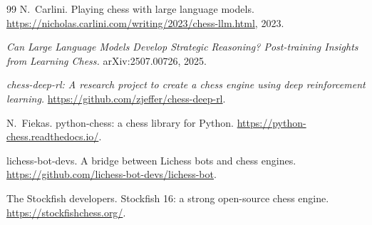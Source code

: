 \documentclass[11pt,a4paper]{article}
\begin{document}
\begin{thebibliography}{99}
N.\ Carlini.
\newblock Playing chess with large language models.
\newblock \url{https://nicholas.carlini.com/writing/2023/chess-llm.html}, 2023.

\emph{Can Large Language Models Develop Strategic Reasoning?
Post-training Insights from Learning Chess.}
\newblock arXiv:2507.00726, 2025.

\emph{chess-deep-rl: A research project to create a chess engine
using deep reinforcement learning.}
\newblock \url{https://github.com/zjeffer/chess-deep-rl}.

N.\ Fiekas.
\newblock python-chess: a chess library for Python.
\newblock \url{https://python-chess.readthedocs.io/}.

lichess-bot-devs.
\newblock A bridge between Lichess bots and chess engines.
\newblock \url{https://github.com/lichess-bot-devs/lichess-bot}.

The Stockfish developers.
\newblock Stockfish 16: a strong open-source chess engine.
\newblock \url{https://stockfishchess.org/}.

\end{thebibliography}
\end{document}
